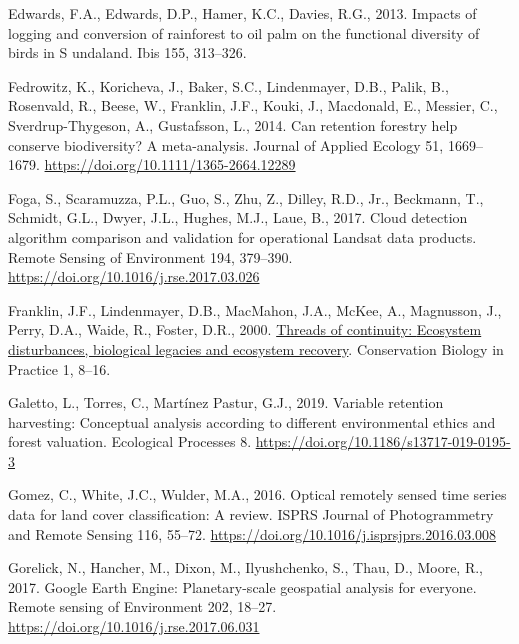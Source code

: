 \documentclass[
  12pt,
]{article}
\newlength{\cslhangindent}
\newlength{\cslentryspacingunit} %
\newenvironment{CSLReferences}[2] %
 {%
  \setlength{\parindent}{0pt}
  \ifodd #1
  \let\oldpar\par
  \def\par{\hangindent=\cslhangindent\oldpar}
  \fi
  \setlength{\parskip}{#2\cslentryspacingunit}
 }%
 {}
\begin{document}
\begin{CSLReferences}{1}{0}
\leavevmode{}%
Edwards, F.A., Edwards, D.P., Hamer, K.C., Davies, R.G., 2013. Impacts of logging and conversion of rainforest to oil palm on the functional diversity of birds in {S} undaland. Ibis 155, 313--326.

\leavevmode{}%
Fedrowitz, K., Koricheva, J., Baker, S.C., Lindenmayer, D.B., Palik, B., Rosenvald, R., Beese, W., Franklin, J.F., Kouki, J., Macdonald, E., Messier, C., Sverdrup-Thygeson, A., Gustafsson, L., 2014. Can retention forestry help conserve biodiversity? {A} meta-analysis. Journal of Applied Ecology 51, 1669--1679. \url{https://doi.org/10.1111/1365-2664.12289}

\leavevmode{}%
Foga, S., Scaramuzza, P.L., Guo, S., Zhu, Z., Dilley, R.D., Jr., Beckmann, T., Schmidt, G.L., Dwyer, J.L., Hughes, M.J., Laue, B., 2017. Cloud detection algorithm comparison and validation for operational {Landsat} data products. Remote Sensing of Environment 194, 379--390. \url{https://doi.org/10.1016/j.rse.2017.03.026}

\leavevmode{}%
Franklin, J.F., Lindenmayer, D.B., MacMahon, J.A., McKee, A., Magnusson, J., Perry, D.A., Waide, R., Foster, D.R., 2000. \href{https://www.researchgate.net/profile/David_Perry6/publication/249472082_Threads_of_Continuity._There_are_immense_differences_between_even-aged_silvicultural_disturbances_\%28es}{Threads of continuity: {Ecosystem} disturbances, biological legacies and ecosystem recovery}. Conservation Biology in Practice 1, 8--16.

\leavevmode{}%
Galetto, L., Torres, C., Martínez Pastur, G.J., 2019. Variable retention harvesting: Conceptual analysis according to different environmental ethics and forest valuation. Ecological Processes 8. \url{https://doi.org/10.1186/s13717-019-0195-3}

\leavevmode{}%
Gomez, C., White, J.C., Wulder, M.A., 2016. Optical remotely sensed time series data for land cover classification: {A} review. ISPRS Journal of Photogrammetry and Remote Sensing 116, 55--72. \url{https://doi.org/10.1016/j.isprsjprs.2016.03.008}

\leavevmode{}%
Gorelick, N., Hancher, M., Dixon, M., Ilyushchenko, S., Thau, D., Moore, R., 2017. Google {Earth} {Engine}: {Planetary}-scale geospatial analysis for everyone. Remote sensing of Environment 202, 18--27. \url{https://doi.org/10.1016/j.rse.2017.06.031}


\end{CSLReferences}
\end{document}
